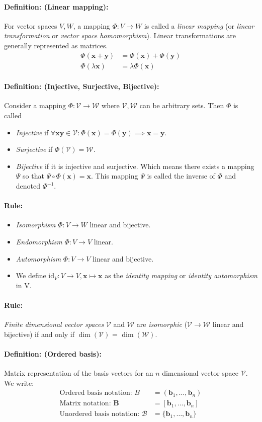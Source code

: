 \documentclass[12pt]{article}
\newcommand{\vecs}[2]{{\bm{#1}_1, \dots, \bm{#1}_#2}}
\newcommand{\xdefinition}[2]{\paragraph{\colorbox{#1!30}{\textbf{Definition:}} (#2):}}
\newcommand{\xrule}[1]{\paragraph{\colorbox{#1!30}{\textbf{Rule:}}}}
\newcommand{\mc}[1]{\mathcal{#1}}
\begin{document}
\xdefinition{blue}{Linear mapping} For vector spaces $V, W$, a mapping $\Phi : V \rightarrow W$ is called a \textit{linear mapping} (or \textit{linear transformation} or \textit{vector space homomorphism}). Linear transformations are generally represented as matrices.
%
\begin{equation}
\begin{aligned}
	\Phi(\bm{x} + \bm{y}) &= \Phi(\bm{x}) + \Phi(\bm{y}) \\
	\Phi(\lambda \bm{x}) &= \lambda \Phi(\bm{x})
\end{aligned}
\end{equation}

\xdefinition{blue}{Injective, Surjective, Bijective} Consider a mapping $\Phi : \mc{V} \rightarrow \mc{W}$ where $\mc{V}, \mc{W}$ can be arbitrary sets. Then $\Phi$ is called
%
\begin{itemize}
	\item \textit{Injective} if $\forall \bm{x} \bm{y} \in \mc{V} : \Phi(\bm{x}) = \Phi(\bm{y}) \implies \bm{x} = \bm{y}$.
	\item \textit{Surjective} if $\Phi(\mc{V}) = \mc{W}$.
	\item \textit{Bijective} if it is injective and surjective. Which means there exists a mapping $\Psi$ so that $\Psi \circ \Phi(\bm{x}) = \bm{x}$. This mapping $\Psi$ is called the inverse of $\Phi$ and denoted $\Phi^{-1}$.
\end{itemize}

\xrule{blue}
%
\begin{itemize}
	\item \textit{Isomorphism} $\Phi : V \rightarrow W$ linear and bijective.
	\item \textit{Endomorphism} $\Phi : V \rightarrow V$ linear.
	\item \textit{Automorphism} $\Phi : V \rightarrow V$ linear and bijective.
	\item We define $\text{id}_V : V \rightarrow V, \bm{x} \mapsto \bm{x}$ as the \textit{identity mapping} or \textit{identity automorphism} in V.
\end{itemize}

\xrule{blue} \textit{Finite dimensional vector spaces} $\mc{V}$ and $\mc{W}$ are \textit{isomorphic} ($\mc{V} \rightarrow \mc{W}$ linear and bijective) if and only if $\dim(\mc{V})$ = $\dim(\mc{W})$.

\xdefinition{blue}{Ordered basis} Matrix representation of the basis vectors for an $n$ dimensional vector space $\mc{V}$. We write:
%
\begin{equation}
\begin{aligned}
	\text{Ordered basis notation: } B &= (\vecs{b}{n}) \\
	\text{Matrix notation: } \bm{B} &= [\vecs{b}{n}] \\
	\text{Unordered basis notation: } \mc{B} &= \{\vecs{b}{n}\}
\end{aligned}
\end{equation}
\end{document}

